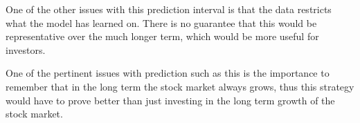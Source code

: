 One of the other issues with this prediction interval is that the data restricts what the model has learned on. There is no guarantee that this would be representative over the much longer term, which would be more useful for investors.

One of the pertinent issues with prediction such as this is the importance to remember that in the long term the stock market always grows, thus this strategy would have to prove better than just investing in the long term growth of the stock market. 





